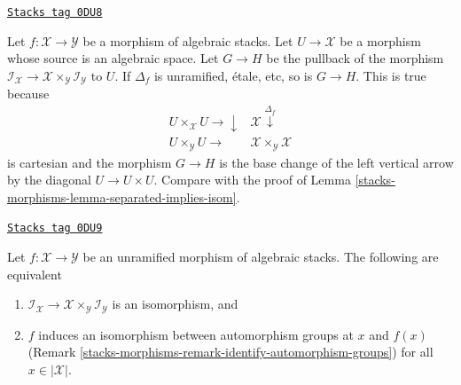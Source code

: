 \begin{remark}
\label{stacks-morphisms-remark-get-property-auts-from-diagonal}
\href{https://stacks.math.columbia.edu/tag/0DU8}{\texttt{Stacks tag 0DU8}}

Let $f : \mathcal{X} \to \mathcal{Y}$ be a morphism of algebraic stacks.
Let $U \to \mathcal{X}$ be a morphism whose source is an algebraic space.
Let $G \to H$ be the pullback of the morphism
$\mathcal{I}_\mathcal{X} \to
\mathcal{X} \times_\mathcal{Y} \mathcal{I}_\mathcal{Y}$
to $U$. If $\Delta_f$ is unramified, \'etale, etc, so
is $G \to H$. This is true because
$$
\begin{array}{cc}U \times_\mathcal{X} U \longrightarrow\downarrow & \mathcal{X} \overset{\Delta_f}{\downarrow} \\ U \times_\mathcal{Y} U \longrightarrow & \mathcal{X} \times_\mathcal{Y} \mathcal{X}\end{array}
$$
is cartesian and the morphism $G \to H$ is the base change of the
left vertical arrow by the diagonal $U \to U \times U$.
Compare with the proof of Lemma \ref{stacks-morphisms-lemma-separated-implies-isom}.
\end{remark}

\begin{lemma}
\label{stacks-morphisms-lemma-aut-iso-unramified}
\href{https://stacks.math.columbia.edu/tag/0DU9}{\texttt{Stacks tag 0DU9}}

Let $f : \mathcal{X} \to \mathcal{Y}$ be an unramified
morphism of algebraic stacks. The following are equivalent
\begin{enumerate}
\item $\mathcal{I}_\mathcal{X} \to
\mathcal{X} \times_\mathcal{Y} \mathcal{I}_\mathcal{Y}$
is an isomorphism, and
\item $f$ induces an isomorphism between automorphism groups at $x$ and $f(x)$
(Remark \ref{stacks-morphisms-remark-identify-automorphism-groups}) for all
$x \in |\mathcal{X}|$.
\end{enumerate}
\end{lemma}

